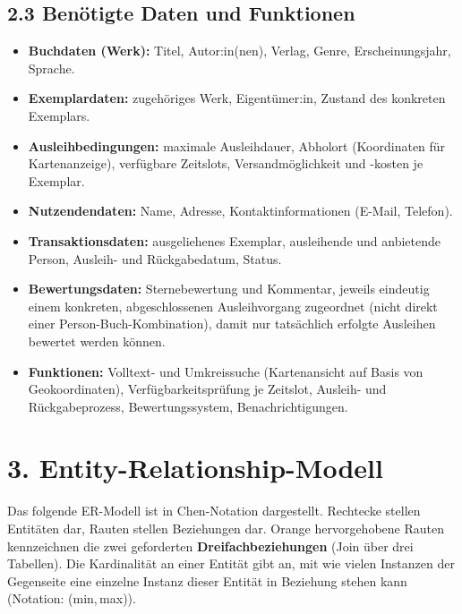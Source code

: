 \documentclass[11pt,a4paper]{article}
\begin{document}
\subsection*{2.3 Benötigte Daten und Funktionen}
\begin{itemize}
    \item \textbf{Buchdaten (Werk):} Titel, Autor:in(nen), Verlag, Genre, Erscheinungsjahr, Sprache.
    \item \textbf{Exemplardaten:} zugehöriges Werk, Eigentümer:in, Zustand des konkreten Exemplars.
    \item \textbf{Ausleihbedingungen:} maximale Ausleihdauer, Abholort (Koordinaten für Kartenanzeige), verfügbare Zeitslots, Versandmöglichkeit und -kosten je Exemplar.
    \item \textbf{Nutzendendaten:} Name, Adresse, Kontaktinformationen (E-Mail, Telefon).
    \item \textbf{Transaktionsdaten:} ausgeliehenes Exemplar, ausleihende und anbietende Person, Ausleih- und Rückgabedatum, Status.
    \item \textbf{Bewertungsdaten:} Sternebewertung und Kommentar, jeweils eindeutig einem konkreten, abgeschlossenen Ausleihvorgang zugeordnet (nicht direkt einer Person-Buch-Kombination), damit nur tatsächlich erfolgte Ausleihen bewertet werden können.
    \item \textbf{Funktionen:} Volltext- und Umkreissuche (Kartenansicht auf Basis von Geokoordinaten), Verfügbarkeitsprüfung je Zeitslot, Ausleih- und Rückgabeprozess, Bewertungssystem, Benachrichtigungen.
\end{itemize}

\section*{3. Entity-Relationship-Modell}

Das folgende ER-Modell ist in Chen-Notation dargestellt. Rechtecke stellen Entitäten dar, Rauten stellen Beziehungen dar. Orange hervorgehobene Rauten kennzeichnen die zwei geforderten \textbf{Dreifachbeziehungen} (Join über drei Tabellen). Die Kardinalität an einer Entität gibt an, mit wie vielen Instanzen der Gegenseite eine einzelne Instanz dieser Entität in Beziehung stehen kann (Notation: (min,\,max)).
\end{document}
